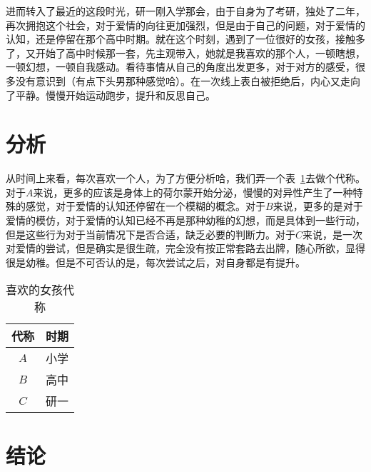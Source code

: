 \documentclass{article}
\begin{document}
进而转入了最近的这段时光，研一刚入学那会，由于自身为了考研，独处了二年，再次拥抱这个社会，对于爱情的向往更加强烈，但是由于自己的问题，对于爱情的认知，还是停留在那个高中时期。就在这个时刻，遇到了一位很好的女孩，接触多了，又开始了高中时候那一套，先主观带入，她就是我喜欢的那个人，一顿瞎想，一顿幻想，一顿自我感动。看待事情从自己的角度出发更多，对于对方的感受，很多没有意识到（有点下头男那种感觉哈）。在一次线上表白被拒绝后，内心又走向了平静。慢慢开始运动跑步，提升和反思自己。

\section{分析}

从时间上来看，每次喜欢一个人，为了方便分析哈，我们弄一个表~\ref{tab:girl}去做个代称。对于$A$来说，更多的应该是身体上的荷尔蒙开始分泌，慢慢的对异性产生了一种特殊的感觉，对于爱情的认知还停留在一个模糊的概念。对于$B$来说，更多的是对于爱情的模仿，对于爱情的认知已经不再是那种幼稚的幻想，而是具体到一些行动，但是这些行为对于当前情况下是否合适，缺乏必要的判断力。对于$C$来说，是一次对爱情的尝试，但是确实是很生疏，完全没有按正常套路去出牌，随心所欲，显得很是幼稚。但是不可否认的是，每次尝试之后，对自身都是有提升。

\begin{table}[!htb]
    \centering
    \caption{喜欢的女孩代称}
    \label{tab:girl}
    \begin{tabular}{cc}
        \toprule
        代称 & 时期 \\
        \midrule
        $A$    & 小学 \\
        $B$    & 高中 \\
        $C$   & 研一 \\
        \bottomrule
    \end{tabular}
\end{table}

\section{结论}
\end{document}
